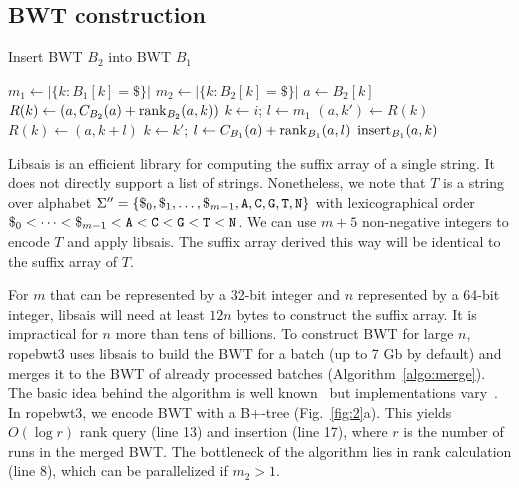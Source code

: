 \documentclass[webpdf,contemporary,large,namedate]{oup-authoring-template}%
\begin{document}

\subsection{BWT construction}

\begin{algorithm}[bt]
	\caption{Insert BWT $B_2$ into BWT $B_1$}\label{algo:merge}
	\begin{algorithmic}[1]
			\State $m_1\gets|\{k:B_1[k]=\$\}|$
			\State $m_2\gets|\{k:B_2[k]=\$\}|$
				\State $a\gets B_2[k]$
				\State $R(k)\gets (a,C_{B_2}(a)+{\rm rank}_{B_2}(a,k))$
			\EndFor
				\State $k\gets i$; $l\gets m_1$
				\Repeat
					\State $(a,k')\gets R(k)$
					\State $R(k)\gets(a,k+l)$
					\State $k\gets k'$; $l\gets C_{B_1}(a)+{\rm rank}_{B_1}(a,l)$
			\EndFor
				\State ${\rm insert}_{B_1}(a,k)$
			\EndFor
		\EndProcedure
	\end{algorithmic}
\end{algorithm}

Libsais is an efficient library for computing the suffix array of a single string.
It does not directly support a list of strings.
Nonetheless, we note that $T$ is a string over alphabet $\Sigma''=\{\$_0,\$_1,\ldots,\$_{m-1},{\tt A},{\tt C},{\tt G},{\tt T},{\tt N}\}$
with lexicographical order $\$_0<\cdots<\$_{m-1}<{\tt A}<{\tt C}<{\tt G}<{\tt T}<{\tt N}$.
We can use $m+5$ non-negative integers to encode $T$ and apply libsais.
The suffix array derived this way will be identical to the suffix array of $T$.

For $m$ that can be represented by a 32-bit integer and $n$ represented by a 64-bit integer,
libsais will need at least $12n$ bytes to construct the suffix array.
It is impractical for $n$ more than tens of billions.
To construct BWT for large $n$, ropebwt3 uses libsais to build the BWT for a batch (up to 7 Gb by default)
and merges it to the BWT of already processed batches (Algorithm~\ref{algo:merge}).
The basic idea behind the algorithm is well known~\citep{DBLP:conf/latin/FerraginaGM10}
but implementations vary~\citep{DBLP:conf/dcc/Siren16,DBLP:conf/dcc/Oliva0SMKGB21}.
In ropebwt3, we encode BWT with a B+-tree (Fig.~\ref{fig:2}a).
This yields $O(\log r)$ rank query (line 13) and insertion (line 17), where $r$ is the number of runs in the merged BWT.
The bottleneck of the algorithm lies in rank calculation (line 8), which can be parallelized if $m_2>1$.
\end{document}
